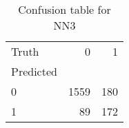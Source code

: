 \begin{table}[h!]
\caption{Confusion table for NN3}
\label{tab:NN3}
\begin{tabular}{lrr}
\toprule
Truth & 0 & 1 \\
Predicted &  &  \\
\midrule
0 & 1559 & 180 \\
1 & 89 & 172 \\
\bottomrule
\end{tabular}
\end{table}

